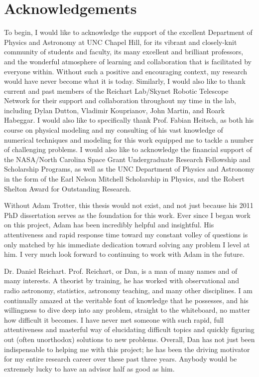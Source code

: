 \chapter*{Acknowledgements}
\label{cha:section_acknowledgements}
To begin, I would like to acknowledge the support of the excellent Department of Physics and Astronomy at UNC Chapel Hill, for its vibrant and closely-knit community of students and faculty, its many excellent and brilliant professors, and the wonderful atmosphere of learning and collaboration that is facilitated by everyone within. Without such a positive and encouraging context, my research would have never become what it is today. Similarly, I would also like to thank current and past members of the Reichart Lab/Skynet Robotic Telescope Network for their support and collaboration throughout my time in the lab, including Dylan Dutton, Vladimir Kouprianov, John Martin, and Roark Habeggar. I would also like to specifically thank Prof. Fabian Heitsch, as both his course on physical modeling and my consulting of his vast knowledge of numerical techniques and modeling for this work equipped me to tackle a number of challenging problems. I would also like to acknowledge the financial support of the NASA/North Carolina Space Grant Undergraduate Research Fellowship and Scholarship Programs, as well as the UNC Department of Physics and Astronomy in the form of the Earl Nelson Mitchell Scholarship in Physics, and the Robert Shelton Award for Outstanding Research.



Without Adam Trotter, this thesis would not exist, and not just because his 2011 PhD dissertation serves as the foundation for this work. Ever since I began work on this project, Adam has been incredibly helpful and insightful. His attentiveness and rapid response time toward my constant volley of questions is only matched by his immediate dedication toward solving any problem I level at him. I very much look forward to continuing to work with Adam in the future.

Dr. Daniel Reichart. Prof. Reichart, or Dan, is a man of many names and of many interests. A theorist by training, he has worked with observational and radio astronomy, statistics, astronomy teaching, and many other disciplines. I am continually amazed at the veritable font of knowledge that he possesses, and his willingness to dive deep into any problem, straight to the whiteboard, no matter how difficult it becomes. I have never met someone with such rapid, full attentiveness and masterful way of elucidating difficult topics and quickly figuring out (often unorthodox) solutions to new problems. Overall, Dan has not just been indispensable to helping me with this project; he has been the driving motivator for my entire research career over these past three years. Anybody would be extremely lucky to have an advisor half as good as him.
